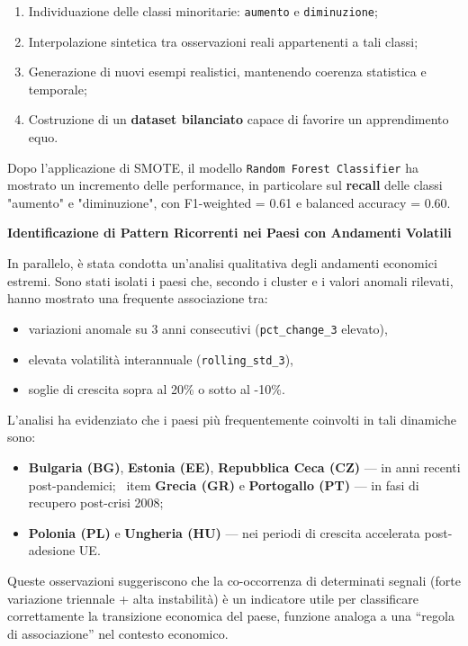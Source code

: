 \documentclass[conference]{IEEEtran}
\begin{document}
\begin{enumerate} \item Individuazione delle classi minoritarie: \texttt{aumento} e \texttt{diminuzione}; \item Interpolazione sintetica tra osservazioni reali appartenenti a tali classi; \item Generazione di nuovi esempi realistici, mantenendo coerenza statistica e temporale; \item Costruzione di un \textbf{dataset bilanciato} capace di favorire un apprendimento equo. \end{enumerate}

Dopo l’applicazione di SMOTE, il modello \texttt{Random Forest Classifier} ha mostrato un incremento delle performance, in particolare sul \textbf{recall} delle classi "aumento" e "diminuzione", con F1-weighted = 0.61 e balanced accuracy = 0.60.

\vspace{1em}\noindent\textbf{Identificazione di Pattern Ricorrenti nei Paesi con Andamenti Volatili}

In parallelo, è stata condotta un’analisi qualitativa degli andamenti economici estremi. Sono stati isolati i paesi che, secondo i cluster e i valori anomali rilevati, hanno mostrato una frequente associazione tra:

\begin{itemize} 
\item variazioni anomale su 3 anni consecutivi (\texttt{pct\_change\_3} elevato), 
\item elevata volatilità interannuale (\texttt{rolling\_std\_3}), 
\item soglie di crescita sopra al 20\% o sotto al -10\%. 
\end{itemize}
L’analisi ha evidenziato che i paesi più frequentemente coinvolti in tali dinamiche sono:
\begin{itemize} 
\item \textbf{Bulgaria (BG)}, \textbf{Estonia (EE)}, \textbf{Repubblica Ceca (CZ)} — in anni recenti post-pandemici; \
item \textbf{Grecia (GR)} e \textbf{Portogallo (PT)} — in fasi di recupero post-crisi 2008; 
\item \textbf{Polonia (PL)} e \textbf{Ungheria (HU)} — nei periodi di crescita accelerata post-adesione UE. 
\end{itemize}
Queste osservazioni suggeriscono che la co-occorrenza di determinati segnali (forte variazione triennale + alta instabilità) è un indicatore utile per classificare correttamente la transizione economica del paese, funzione analoga a una “regola di associazione” nel contesto economico.
\end{document}

